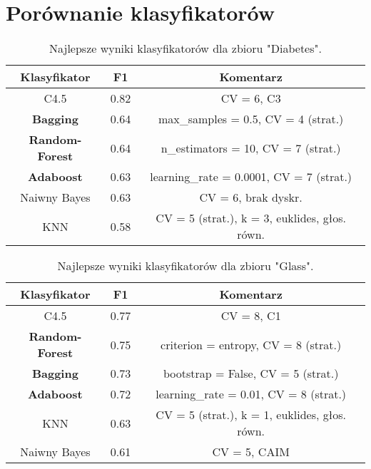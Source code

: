 \pagebreak
\section{Porównanie klasyfikatorów}

    \begin{table}[H]
        \center
        \begin{tabular}{|c|c|c|}
            \hline
            Klasyfikator &  F1    & Komentarz \\ \hline
            C4.5         & 0.82   & CV = 6, C3 \\ \hline

            \textbf{Bagging}      & 0.64  & max\_samples = 0.5, CV = 4 (strat.) \\ \hline
            \textbf{Random-Forest}& 0.64  & n\_estimators = 10, CV = 7 (strat.) \\ \hline
            \textbf{Adaboost}     & 0.63   & learning\_rate = 0.0001, CV = 7 (strat.) \\ \hline

            Naiwny Bayes & 0.63   & CV = 6, brak dyskr. \\ \hline
            KNN          & 0.58   & CV = 5 (strat.), k = 3, euklides, głos. równ. \\ \hline
        \end{tabular}
        \caption{Najlepsze wyniki klasyfikatorów dla zbioru "Diabetes".}
    \end{table}

    \begin{table}[H]
        \center
        \begin{tabular}{|c|c|c|}
            \hline
            Klasyfikator & F1     & Komentarz \\ \hline
            C4.5         & 0.77   & CV = 8, C1 \\ \hline

            \textbf{Random-Forest}& 0.75  & criterion = entropy, CV = 8 (strat.) \\ \hline
            \textbf{Bagging}      & 0.73  & bootstrap = False, CV = 5 (strat.) \\ \hline
            \textbf{Adaboost}     & 0.72   & learning\_rate = 0.01, CV = 8 (strat.) \\ \hline

            KNN          & 0.63   & CV = 5 (strat.), k = 1, euklides, głos. równ. \\ \hline
            Naiwny Bayes & 0.61   & CV = 5, CAIM \\ \hline
        \end{tabular}
        \caption{Najlepsze wyniki klasyfikatorów dla zbioru "Glass".}
    \end{table}

